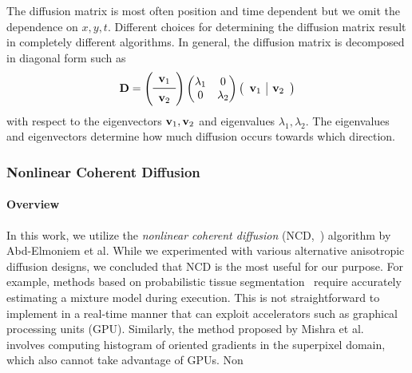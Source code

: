 The diffusion matrix is most often position and time dependent but we omit the dependence on \(x, y, t\).
Different choices for determining the diffusion matrix result in completely different algorithms.
In general, the diffusion matrix is decomposed in diagonal form such as
\begin{align}
  \mD = 
  \left(
  \begin{array}{cc}
    \vv_1 \\
    \midrule
    \vv_2
  \end{array}
  \right)
  \begin{pmatrix}
    \lambda_1 & 0 \\
    0 & \lambda_2
  \end{pmatrix}
  \left(
  \begin{array}{c|c}
       \vv_1 & \vv_2
  \end{array}
  \right)
\end{align}
with respect to the eigenvectors \(\mathbf{v}_1, \mathbf{v}_2\) and eigenvalues \(\lambda_1, \lambda_2\).
The eigenvalues and eigenvectors determine how much diffusion occurs towards which direction.

\subsubsection{Nonlinear Coherent Diffusion}
\paragraph{Overview}
In this work, we utilize the \textit{nonlinear coherent diffusion} (NCD,~\cite{abd-elmoniem_realtime_2002}) algorithm by Abd-Elmoniem et al.
While we experimented with various alternative anisotropic diffusion designs, we concluded that NCD is the most useful for our purpose.
For example, methods based on probabilistic tissue segmentation~\cite{hutchison_probabilisticdriven_2010, ramos-llorden_anisotropic_2015} require accurately estimating a mixture model during execution.
This is not straightforward to implement in a real-time manner that can exploit accelerators such as graphical processing units (GPU).
Similarly, the method proposed by Mishra et al.~\cite{mishra_edge_2018} involves computing histogram of oriented gradients in the superpixel domain, which also cannot take advantage of GPUs.
Non

